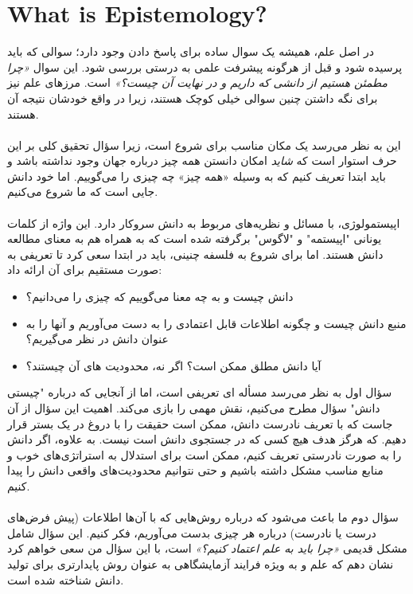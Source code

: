 \documentclass[10pt,a4paper]{article}
\begin{document}
    \section{What is Epistemology?}
            \indent در اصل علم، همیشه یک سوال ساده برای پاسخ دادن وجود دارد؛ سوالی که باید پرسیده شود و قبل از هرگونه پیشرفت علمی به درستی بررسی شود. این سوال \textit{«چرا مطمئن هستیم از دانشی که داریم و در نهایت آن چیست؟»} است. مرزهای علم نیز برای نگه داشتن چنین سوالی خیلی کوچک هستند، زیرا در واقع خودشان نتیجه آن هستند.
            \\
            \\
           این به نظر می‌رسد یک مکان مناسب برای شروع است، زیرا سؤال تحقیق کلی بر این حرف استوار است که \textit{شاید} امکان دانستن همه چیز درباره جهان وجود نداشته باشد و باید ابتدا تعریف کنیم که به وسیله «همه چیز» چه چیزی را می‌گوییم. اما خود دانش جایی است که ما شروع می‌کنیم.
            \\
            \\
            \indent اپیستمولوژی، با مسائل و نظریه‌های مربوط به دانش سروکار دارد. این واژه از کلمات یونانی "اپیستمه" و "لاگوس" برگرفته شده است که به همراه هم به معنای مطالعه دانش هستند. اما برای شروع به فلسفه چنینی، باید در ابتدا سعی کرد تا تعریفی به صورت مستقیم برای آن ارائه داد:
            \begin{itemize}
                \item دانش چیست و به چه معنا می‌گوییم که چیزی را می‌دانیم؟
                \item منبع دانش چیست و چگونه اطلاعات قابل اعتمادی را به دست می‌آوریم و آنها را به عنوان دانش در نظر می‌گیریم؟
                \item آیا دانش مطلق ممکن است؟ اگر نه، محدودیت های آن چیستند؟ \cite{CW/E}
            \end{itemize}
            \indent سؤال اول به نظر می‌رسد مسأله ای تعریفی است، اما از آنجایی که درباره "چیستی دانش" سؤال مطرح می‌کنیم، نقش مهمی را بازی می‌کند. اهمیت این سؤال از آن جاست که با تعریف نادرست دانش، ممکن است حقیقت را با دروغ در یک بستر قرار دهیم. که هرگز هدف هیچ کسی که در جستجوی دانش است نیست. به علاوه، اگر دانش را به صورت نادرستی تعریف کنیم، ممکن است برای استدلال به استراتژی‌های خوب و منابع مناسب مشکل داشته باشیم و حتی نتوانیم محدودیت‌های واقعی دانش را پیدا کنیم.
            \\
            \\
            \indent سؤال دوم ما باعث می‌شود که درباره روش‌هایی که با آن‌ها اطلاعات (پیش فرض‌های درست یا نادرست) درباره هر چیزی بدست می‌آوریم، فکر کنیم. این سؤال شامل مشکل قدیمی \textit{«چرا باید به علم اعتماد کنیم؟»} است، با این سؤال من سعی خواهم کرد نشان دهم که علم و به ویژه فرایند آزمایشگاهی به عنوان روش پایدارتری برای تولید دانش شناخته شده است.
\end{document}
